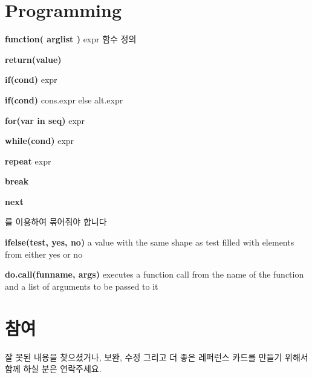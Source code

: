 \documentclass[landscape,twocolumn,letterpaper]{article}
\begin{document}
\section{Programming}

\textbf{function( arglist )} expr 함수 정의

\textbf{return(value)}

\textbf{if(cond)} expr

\textbf{if(cond)} cons.expr else alt.expr

\textbf{for(var in seq)} expr

\textbf{while(cond)} expr

\textbf{repeat} expr

\textbf{break}

\textbf{next}

{} 를 이용하여 묶어줘야 합니다

\textbf{ifelse(test, yes, no)} a value with the same shape as test filled
with elements from either yes or no

\textbf{do.call(funname, args)} executes a function call from the name of
the function and a list of arguments to be passed to it


\section{참여}
잘 못된 내용을 찾으셨거나, 보완, 수정 그리고 더 좋은 레퍼런스 카드를 만들기 위해서 함께 하실 분은 연락주세요.
\end{document}
